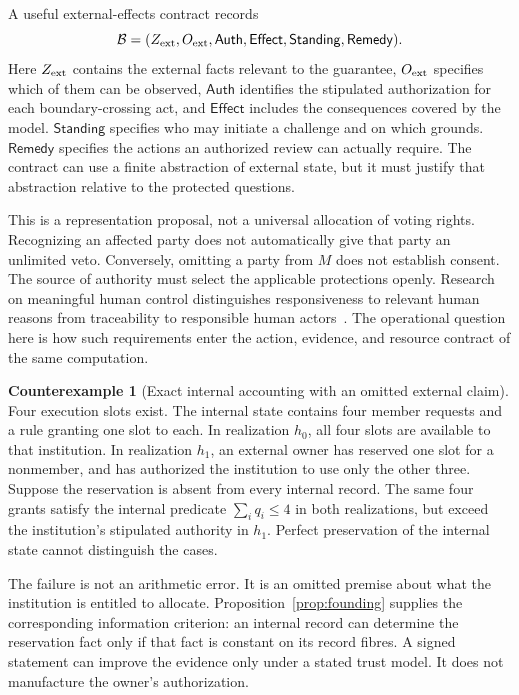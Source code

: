 \documentclass[11pt,letterpaper]{article}
\theoremstyle{plain}
\theoremstyle{definition}
\newtheorem{counterexample}[proposition]{Counterexample}
\theoremstyle{remark}
\begin{document}
A useful external-effects contract records
\[
\mathcal B=(Z_{\rm ext},O_{\rm ext},\mathsf{Auth},\mathsf{Effect},
\mathsf{Standing},\mathsf{Remedy}).
\]
Here $Z_{\rm ext}$ contains the external facts relevant to the guarantee, $O_{\rm ext}$ specifies which of them can be observed, $\mathsf{Auth}$ identifies the stipulated authorization for each boundary-crossing act, and $\mathsf{Effect}$ includes the consequences covered by the model. $\mathsf{Standing}$ specifies who may initiate a challenge and on which grounds. $\mathsf{Remedy}$ specifies the actions an authorized review can actually require. The contract can use a finite abstraction of external state, but it must justify that abstraction relative to the protected questions.

This is a representation proposal, not a universal allocation of voting rights. Recognizing an affected party does not automatically give that party an unlimited veto. Conversely, omitting a party from $M$ does not establish consent. The source of authority must select the applicable protections openly. Research on meaningful human control distinguishes responsiveness to relevant human reasons from traceability to responsible human actors~\cite{meaningfulcontrol}. The operational question here is how such requirements enter the action, evidence, and resource contract of the same computation.

\begin{counterexample}[Exact internal accounting with an omitted external claim]\label{ex:external-claim}
Four execution slots exist. The internal state contains four member requests and a rule granting one slot to each. In realization $h_0$, all four slots are available to that institution. In realization $h_1$, an external owner has reserved one slot for a nonmember, and has authorized the institution to use only the other three. Suppose the reservation is absent from every internal record. The same four grants satisfy the internal predicate $\sum_iq_i\le4$ in both realizations, but exceed the institution's stipulated authority in $h_1$. Perfect preservation of the internal state cannot distinguish the cases.
\end{counterexample}

The failure is not an arithmetic error. It is an omitted premise about what the institution is entitled to allocate. Proposition~\ref{prop:founding} supplies the corresponding information criterion: an internal record can determine the reservation fact only if that fact is constant on its record fibres. A signed statement can improve the evidence only under a stated trust model. It does not manufacture the owner's authorization.
\end{document}
